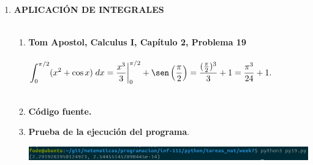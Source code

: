 \begin{enumerate}
\begin{enumerate}[\bfseries a)]
    \end{enumerate}

\newpage

\item \textbf{\large APLICACIÓN DE INTEGRALES}\\\\

    \begin{enumerate}[\bfseries a)]

	\item \textbf{\large Tom Apostol, Calculus I, Capítulo 2, Problema 19}\\\\
	$\displaystyle\int_{0}^{\pi/2} (x^2+\cos x)\; dx = \dfrac{x^3}{3}\bigg|_0^{\pi/2}+\sen\left(\dfrac{\pi}{2}\right) = \dfrac{(\frac{\pi}{2})^3}{3} + 1 = \dfrac{\pi^3}{24}+1.$\\\\

	\item \textbf{Código fuente.}\\ 
	    
	    
	    \vspace{.5cm}
	
	\item \textbf{Prueba de la ejecución del programa}.\\
	    \begin{center}
		\includegraphics[scale=.55]{imagenes/tareas_mat/week7/py19.png}
	    \end{center}

    \end{enumerate}

\newpage
\end{enumerate}
